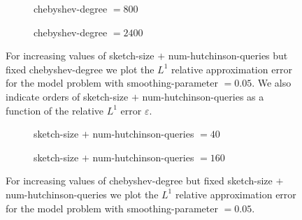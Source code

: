 \begin{figure}[ht]
    \begin{subfigure}[b]{0.49\columnwidth}
        
        \caption{\gls{chebyshev-degree} $=800$}
        \label{fig:5-experiments-electronic-structure-convergence-nv-m800}
    \end{subfigure}
    \begin{subfigure}[b]{0.49\columnwidth}
        
        \caption{\gls{chebyshev-degree} $=2400$}
        \label{fig:5-experiments-electronic-structure-convergence-nv-m2400}
    \end{subfigure}
    \caption{For increasing values of \gls{sketch-size} $+$ \gls{num-hutchinson-queries}
    but fixed \gls{chebyshev-degree} we plot the $L^1$ relative approximation error 
    for the model problem with \gls{smoothing-parameter} $=0.05$.
    We also indicate orders of \gls{sketch-size} $+$ \gls{num-hutchinson-queries}
    as a function of the relative $L^1$ error $\varepsilon$.}
    \label{fig:5-experiments-electronic-structure-convergence-nv}
\end{figure}

\begin{figure}[ht]
    \centering
    \begin{subfigure}[b]{0.49\columnwidth}
        
        \caption{\gls{sketch-size} $+$ \gls{num-hutchinson-queries} $=40$}
        \label{fig:5-experiments-electronic-structure-convergence-m-nv40}
    \end{subfigure}
    \begin{subfigure}[b]{0.49\columnwidth}
        
        \caption{\gls{sketch-size} $+$ \gls{num-hutchinson-queries} $=160$}
        \label{fig:5-experiments-electronic-structure-convergence-m-nv160}
    \end{subfigure}
    \caption{For increasing values of \gls{chebyshev-degree} but fixed
    \gls{sketch-size} $+$ \gls{num-hutchinson-queries} we plot the $L^1$ relative
    approximation error 
    for the model problem with \gls{smoothing-parameter} $=0.05$.}
    \label{fig:5-experiments-electronic-structure-convergence-m}
\end{figure}

